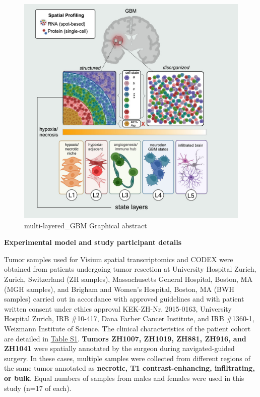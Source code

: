 \documentclass[
]{book}
\begin{document}
\begin{figure}
\centering
\includegraphics{./figs/spatialDatasets/multi-layered_GBM.jpg}
\caption{multi-layered\_GBM Graphical abstract}
\end{figure}

\textbf{Experimental model and study participant details}

Tumor samples used for Visium spatial transcriptomics and CODEX were obtained from patients undergoing tumor resection at University Hospital Zurich, Zurich, Switzerland (ZH samples), Massachusetts General Hospital, Boston, MA (MGH samples), and Brigham and Women's Hospital, Boston, MA (BWH samples) carried out in accordance with approved guidelines and with patient written consent under ethics approval KEK-ZH-Nr. 2015-0163, University Hospital Zurich, IRB \#10-417, Dana Farber Cancer Institute, and IRB \#1360-1, Weizmann Institute of Science. The clinical characteristics of the patient cohort are detailed in \href{https://www.cell.com/cms/10.1016/j.cell.2024.03.029/attachment/89b1c464-df78-4b1d-b0c4-22ff214799c7/mmc1}{Table S1}. \textbf{Tumors ZH1007, ZH1019, ZH881, ZH916, and ZH1041} were spatially annotated by the surgeon during navigated-guided surgery. In these cases, multiple samples were collected from different regions of the same tumor annotated as \textbf{necrotic, T1 contrast-enhancing, infiltrating, or bulk}. Equal numbers of samples from males and females were used in this study (n=17 of each).
\end{document}
